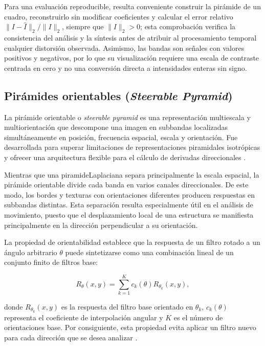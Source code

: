 Para una evaluación reproducible, resulta conveniente construir la pirámide de un cuadro, reconstruirlo sin modificar coeficientes y calcular el error relativo $\|I-\widehat I\|_2/\|I\|_2$, siempre que $\|I\|_2>0$; esta comprobación verifica la consistencia del análisis y la síntesis antes de atribuir al procesamiento temporal cualquier distorsión observada. Asimismo, las bandas son señales con valores positivos y negativos, por lo que su visualización requiere una escala de contraste centrada en cero y no una conversión directa a intensidades enteras sin signo.

\subsection{Pirámides orientables (\textit{Steerable Pyramid})}
	\label{subsubsec:piramides_orientables}

La pirámide orientable o \textit{steerable pyramid} es una representación multiescala y multiorientación que descompone una imagen en subbandas localizadas simultáneamente en posición, frecuencia espacial, escala y orientación. Fue desarrollada para superar limitaciones de representaciones piramidales isotrópicas y ofrecer una arquitectura flexible para el cálculo de derivadas direccionales \cite{simoncelli1995steerable}.

Mientras que una \gls{piramideLaplaciana} separa principalmente la escala espacial, la pirámide orientable divide cada banda en varios canales direccionales. De este modo, los bordes y texturas con orientaciones diferentes producen respuestas en subbandas distintas. Esta separación resulta especialmente útil en el análisis de movimiento, puesto que el desplazamiento local de una estructura se manifiesta principalmente en la dirección perpendicular a su orientación.

La propiedad de orientabilidad establece que la respuesta de un filtro rotado a un ángulo arbitrario $\theta$ puede sintetizarse como una combinación lineal de un conjunto finito de filtros base:

\begin{equation}
    R_{\theta}(x,y)
    =
    \sum_{k=1}^{K}
    c_k(\theta)R_{\theta_k}(x,y),
    \label{eq:orientabilidad_respuestas}
\end{equation}

donde $R_{\theta_k}(x,y)$ es la respuesta del filtro base orientado en $\theta_k$, $c_k(\theta)$ representa el coeficiente de interpolación angular y $K$ es el número de orientaciones base. Por consiguiente, esta propiedad evita aplicar un filtro nuevo para cada dirección que se desea analizar \cite{freeman1991steerable,simoncelli1995steerable}.

